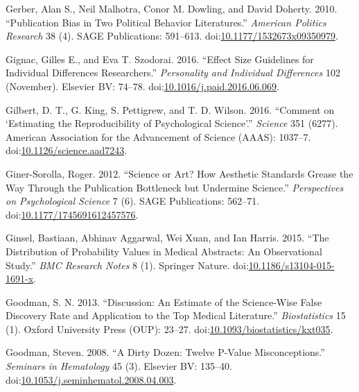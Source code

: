 \documentclass[a5paper]{book}
\begin{document}
\hypertarget{ref-doi:10.1177ux2f1532673x09350979}{}
Gerber, Alan S., Neil Malhotra, Conor M. Dowling, and David Doherty.
2010. ``Publication Bias in Two Political Behavior Literatures.''
\emph{American Politics Research} 38 (4). SAGE Publications: 591--613.
doi:\href{https://doi.org/10.1177/1532673x09350979}{10.1177/1532673x09350979}.

\hypertarget{ref-doi:10.1016ux2fj.paid.2016.06.069}{}
Gignac, Gilles E., and Eva T. Szodorai. 2016. ``Effect Size Guidelines
for Individual Differences Researchers.'' \emph{Personality and
Individual Differences} 102 (November). Elsevier BV: 74--78.
doi:\href{https://doi.org/10.1016/j.paid.2016.06.069}{10.1016/j.paid.2016.06.069}.

\hypertarget{ref-doi:10.1126ux2fscience.aad7243}{}
Gilbert, D. T., G. King, S. Pettigrew, and T. D. Wilson. 2016. ``Comment
on `Estimating the Reproducibility of Psychological Science'.''
\emph{Science} 351 (6277). American Association for the Advancement of
Science (AAAS): 1037--7.
doi:\href{https://doi.org/10.1126/science.aad7243}{10.1126/science.aad7243}.

\hypertarget{ref-doi:10.1177ux2f1745691612457576}{}
Giner-Sorolla, Roger. 2012. ``Science or Art? How Aesthetic Standards
Grease the Way Through the Publication Bottleneck but Undermine
Science.'' \emph{Perspectives on Psychological Science} 7 (6). SAGE
Publications: 562--71.
doi:\href{https://doi.org/10.1177/1745691612457576}{10.1177/1745691612457576}.

\hypertarget{ref-doi:10.1186ux2fs13104-015-1691-x}{}
Ginsel, Bastiaan, Abhinav Aggarwal, Wei Xuan, and Ian Harris. 2015.
``The Distribution of Probability Values in Medical Abstracts: An
Observational Study.'' \emph{BMC Research Notes} 8 (1). Springer Nature.
doi:\href{https://doi.org/10.1186/s13104-015-1691-x}{10.1186/s13104-015-1691-x}.

\hypertarget{ref-doi:10.1093ux2fbiostatisticsux2fkxt035}{}
Goodman, S. N. 2013. ``Discussion: An Estimate of the Science-Wise False
Discovery Rate and Application to the Top Medical Literature.''
\emph{Biostatistics} 15 (1). Oxford University Press (OUP): 23--27.
doi:\href{https://doi.org/10.1093/biostatistics/kxt035}{10.1093/biostatistics/kxt035}.

\hypertarget{ref-doi:10.1053ux2fj.seminhematol.2008.04.003}{}
Goodman, Steven. 2008. ``A Dirty Dozen: Twelve P-Value Misconceptions.''
\emph{Seminars in Hematology} 45 (3). Elsevier BV: 135--40.
doi:\href{https://doi.org/10.1053/j.seminhematol.2008.04.003}{10.1053/j.seminhematol.2008.04.003}.
\end{document}
